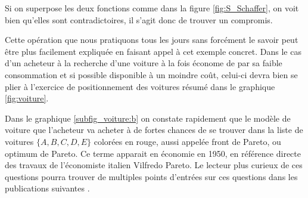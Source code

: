 Si on superpose les deux fonctions comme dans la figure \ref{fig:S_Schaffer}, on voit bien qu'elles sont contradictoires, il s'agit donc de trouver un compromis.

Cette opération que nous pratiquons tous les jours sans forcément le savoir peut être plus facilement expliquée en faisant appel à cet exemple concret. Dans le cas d'un acheteur à la recherche d'une voiture à la fois économe de par sa faible consommation et si possible disponible à un moindre coût, celui-ci devra bien se plier à l'exercice de positionnement des voitures résumé dans le graphique \ref{fig:voiture}.

Dans le graphique \ref{subfig_voiture:b} on constate rapidement que le modèle de voiture que l'acheteur va acheter à de fortes chances de se trouver dans la liste de voitures $\{ A,B,C,D,E \}$ colorées en rouge, aussi appelée front de Pareto, ou optimum de Pareto. Ce terme apparait en économie en 1950, en référence directe des travaux de l'économiste italien Vilfredo Pareto. Le lecteur plus curieux de ces questions pourra trouver de multiples points d'entrées sur ces questions dans les publications suivantes \autocites{Ehrgott2012,Koksalan2011,Koksalan2013}.

\pagebreak

